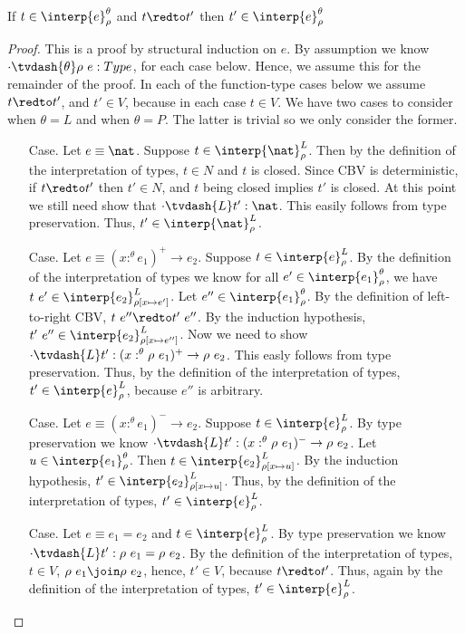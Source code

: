 \begin{lemma}[$\CRII$]
  \label{lemma:crii}
  If $t \in \interp{e}^\theta_\rho$ and $t \redto t'$ then $t' \in \interp{e}^\theta_\rho$
\end{lemma}
\begin{proof}
  This is a proof by structural induction on $e$.  By assumption we know 
  $\cdot \tvdash{\theta} \rho\ e:Type$, for each case below.  Hence, we assume this for
  the remainder of the proof.  In each of the function-type cases below we 
  assume $t \redto t'$, and $t' \in V$, because in each case $t \in V$.  We have two cases
  to consider when $\theta = L$ and when $\theta = P$.  The latter is trivial so we only
  consider the former.

  \begin{itemize}
  \item[Case.] Let $e \equiv \nat$.  
    Suppose $t \in \interp{\nat}^L_\rho$.  Then by the definition of the 
    interpretation of types, $t \in N$ and $t$ is closed.  Since CBV is deterministic,
    if $t \redto t'$ then $t' \in N$, and $t$ being closed implies $t'$ is closed.  At this
    point we still need show that $\cdot \tvdash{L} t':\nat$.  This easily follows from
    type preservation. Thus, $t' \in \interp{\nat}^L_\rho$.

  \item[Case.] Let $e \equiv (x :^\theta e_1)^+ \rightarrow e_2$.    
    Suppose $t \in \interp{e}^L_\rho$.  By the definition of the interpretation of types we know 
    for all $e' \in \interp{e_1}^\theta_\rho$, we have 
    $t\ e' \in \interp{e_2}^L_{\rho[x \mapsto e']}$.  
    Let $e'' \in \interp{e_1}^\theta_\rho$.  By the definition of left-to-right CBV, 
    $t\ e'' \redto t'\ e''$.  By the induction hypothesis, 
    $t'\ e'' \in \interp{e_2}^L_{\rho[x \mapsto e'']}$.  Now we need to show
    $\cdot \tvdash{L} t':(x :^\theta \rho\ e_1)^+ \rightarrow \rho\ e_2$.  This easly follows
    from type preservation.  Thus, by the definition 
    of the interpretation of types, $t' \in \interp{e}^L_{\rho}$, because $e''$ is arbitrary.
    
  \item[Case.] Let $e \equiv (x :^\theta e_1)^- \to e_2$.
    Suppose $t \in \interp{e}^L_\rho$.  By type preservation we know 
    $\cdot \tvdash{L} t':(x :^\theta \rho\ e_1)^- \to \rho\ e_2$.
    Let $u \in \interp{e_1}^\theta_\rho$. Then 
    $t \in \interp{e_2}^L_{\rho[x \mapsto u]}$.  By the induction hypothesis,
    $t' \in \interp{e_2}^L_{\rho[x \mapsto u]}$.  Thus, by the definition
    of the interpretation of types, $t' \in \interp{e}^L_\rho$.
      
  \item[Case.] Let $e \equiv e_1 = e_2$ and $t \in \interp{e}^L_\rho$.  
    By type preservation we know 
    $\cdot \tvdash{L} t':\rho\ e_1 = \rho\ e_2$.  By the definition of the 
    interpretation of types, $t \in V$, $\rho\ e_1 \join \rho\ e_2$, hence, 
    $t' \in V$, because $t \redto t'$.  Thus, again by the definition 
    of the interpretation of types, $t' \in \interp{e}^L_\rho$.    
  \end{itemize}
\end{proof}


